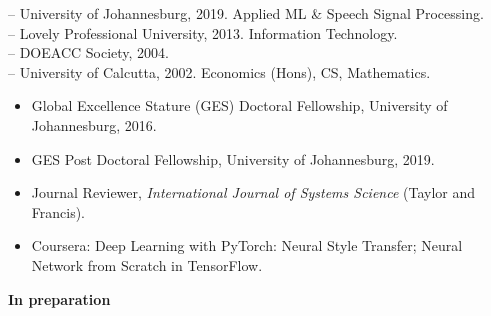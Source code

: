 \documentclass[11pt,a4paper]{article}
\begin{document}
\vspace{.2cm}

\noindent {} -- University of Johannesburg, 2019. Applied ML \& Speech Signal Processing. \\[0.1cm]
\noindent {} -- Lovely Professional University, 2013. Information Technology. \\[0.1cm]
\noindent {} -- DOEACC Society, 2004. \\[0.1cm]
\noindent {} -- University of Calcutta, 2002. Economics (Hons), CS, Mathematics.

\spacedhrule{0.3em}{0.5em}



\begin{itemize}[leftmargin=1cm, itemsep=-0.1cm]
	\item Global Excellence Stature (GES) Doctoral Fellowship, University of Johannesburg, 2016.
	\item GES Post Doctoral Fellowship, University of Johannesburg, 2019.
	\item Journal Reviewer, \textit{International Journal of Systems Science} (Taylor and Francis).
	\item Coursera: Deep Learning with PyTorch: Neural Style Transfer; Neural Network from Scratch in TensorFlow.
\end{itemize}

\spacedhrule{-0.3em}{0.5em}



\vspace{0.2cm}

\printbibliography[heading=none, nottype=unpublished]

\vspace{0.2cm}
\noindent\textbf{In preparation}

\printbibliography[heading=none, type=unpublished, resetnumbers=false]
\end{document}

